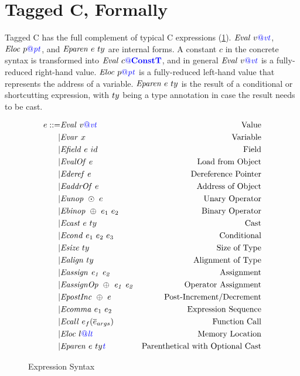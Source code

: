 \documentclass{llncs}
\begin{document}
\appendix


\section{Tagged C, Formally}

Tagged C has the full complement of typical C expressions (\cref{fig:expr}). \(\mathit{Eval} ~ v{\color{blue} @}\mathit{\color{blue} vt}\),
\(\mathit{Eloc} ~ p{\color{blue} @}\mathit{\color{blue} pt}\), and \(\mathit{Eparen} ~ e ~ ty\) are internal forms.
A constant \(c\) in the concrete syntax is transformed into \(\mathit{Eval} ~ c{\color{blue} @}\color{blue} \mathbf{ConstT}\),
and in general \(\mathit{Eval} ~ v{\color{blue} @}\mathit{\color{blue} vt}\) is a fully-reduced right-hand value. \(\mathit{Eloc} ~ p{\color{blue} @}\mathit{\color{blue} pt}\)
is a fully-reduced left-hand value that represents the address of a variable.
\(\mathit{Eparen} ~ e ~ ty\) is the result of a conditional or shortcutting
expression, with \(ty\) being a type annotation in case the result needs to
be cast.

\begin{figure}
  \[\begin{aligned}
  e ::= & \mathit{Eval} ~ v{\color{blue} @}\mathit{\color{blue} vt} & \textnormal{Value} \\
  | & \mathit{Evar} ~ x & \textnormal{Variable} \\
  | & \mathit{Efield} ~ e ~ id & \textnormal{Field} \\
  | & \mathit{EvalOf} ~ e & \textnormal{Load from Object} \\
  | & \mathit{Ederef} ~ e & \textnormal{Dereference Pointer} \\
  | & \mathit{EaddrOf} ~ e & \textnormal{Address of Object} \\
  | & \mathit{Eunop} ~ \odot ~ e & \textnormal{Unary Operator} \\
  | & \mathit{Ebinop} ~ \oplus ~ e_1 ~ e_2 & \textnormal{Binary Operator} \\
  | & \mathit{Ecast} ~ e ~ ty & \textnormal{Cast} \\
  | & \mathit{Econd} ~ e_1 ~ e_2 ~ e_3 & \textnormal{Conditional} \\
  | & \mathit{Esize} ~ ty & \textnormal{Size of Type} \\
  | & \mathit{Ealign} ~ ty & \textnormal{Alignment of Type} \\
  | & \mathit{Eassign ~ e_1 ~ e_2} & \textnormal{Assignment} \\
  | & \mathit{EassignOp ~ \oplus ~ e_1 ~ e_2} & \textnormal{Operator Assignment} \\
  | & \mathit{EpostInc} ~ \oplus ~ e & \textnormal{Post-Increment/Decrement} \\
  | & \mathit{Ecomma} ~ e_1 ~ e_2 & \textnormal{Expression Sequence} \\
  | & \mathit{Ecall} ~ e_f(\overline{e}_{args}) & \textnormal{Function Call} \\
  | & \mathit{Eloc} ~ l{\color{blue} @}\mathit{\color{blue} lt} & \textnormal{Memory Location} \\
  | & \mathit{Eparen} ~ e ~ ty{\mathit{\color{blue} t}} & \textnormal{Parenthetical with Optional Cast} \\
  \end{aligned}\]
  \caption{Expression Syntax}
  \label{fig:expr}
\end{figure}
\end{document}
